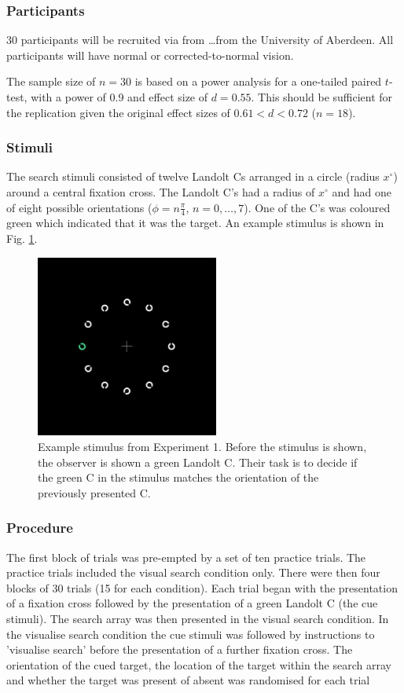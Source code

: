 \documentclass[smallextended]{svjour3}       %
\begin{document}
\subsubsection{Participants}

30 participants will be recruited via from \ldots from the University of Aberdeen. All participants will have normal or corrected-to-normal vision. 

The sample size of $n=30$ is based on a power analysis for a one-tailed paired $t$-test, with a power of 0.9 and effect size of $d=0.55$. This should be sufficient for the replication given the original effect sizes of $0.61<d<0.72$ ($n=18$).


\subsubsection{Stimuli}

The search stimuli consisted of twelve Landolt Cs arranged in a circle (radius $x^{\circ}$) around a central fixation cross. The Landolt C's had a radius of $x^{\circ}$ and had one of eight possible orientations ($\phi=n\frac{\pi}{4}$, $n=0,\ldots,7$). One of the C's was coloured green which indicated that it was the target. An example stimulus is shown in Fig. \ref{fig:exp1stimulus}.

\begin{figure}
\centering
\includegraphics[width=6cm]{figs/exStimExp1.png}
\caption{Example stimulus from Experiment 1. Before the stimulus is shown, the observer is shown a green Landolt C. Their task is to decide if the green C in the stimulus matches the orientation of the previously presented C.}
\label{fig:exp1stimulus}
\end{figure}

\subsubsection{Procedure}
The first block of trials was pre-empted by a set of ten practice trials. The practice trials included the visual search condition only. There were then four blocks of 30 trials (15 for each condition). Each trial began with the presentation of a fixation cross followed by the presentation of a green Landolt C (the cue stimuli). The search array was then presented in the visual search condition. In the visualise search condition the cue stimuli was followed by instructions to 'visualise search' before the presentation of a further fixation cross. 
The orientation of the cued target, the location of the target within the search array and whether the target was present of absent was randomised for each trial
\end{document}
